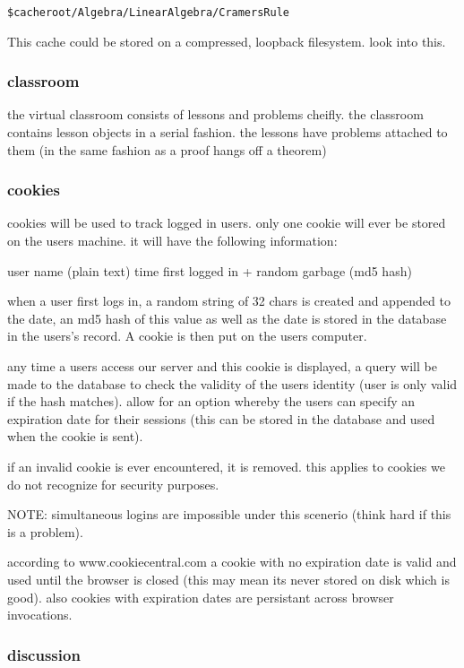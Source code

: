 \verb|$cacheroot/Algebra/LinearAlgebra/CramersRule|

This cache could be stored on a compressed, loopback
filesystem. look into this.

\subsubsection*{classroom}

the virtual classroom consists of lessons and problems cheifly. the classroom contains lesson objects in a serial fashion. the lessons have problems attached to them (in the same fashion as a proof hangs off a theorem)

\subsubsection*{cookies}

cookies will be used to track logged in users. only one cookie will ever be stored on the users machine. it will have the following information:

 user name (plain text)
 time first logged in + random garbage (md5 hash)

when a user first logs in, a random string of 32 chars is created and appended to the date, an md5 hash of this value as well as the date is stored in the database in the users's record. A cookie is then put on the users computer.

any time a users access our server and this cookie is displayed, a query will be made to the database to check the validity of the users identity (user is only valid if the hash matches). allow for an option whereby the users can specify an expiration date for their sessions (this can be stored in the database and used when the cookie is sent).

if an invalid cookie is ever encountered, it is removed. this applies to cookies we do not recognize for security purposes.

NOTE: simultaneous logins are impossible under this scenerio (think hard if this is a problem).

according to www.cookiecentral.com a cookie with no expiration date is valid and used until the browser is closed (this may mean its never stored on disk which is good). also cookies with expiration dates are persistant across browser invocations.

\subsubsection*{discussion}

